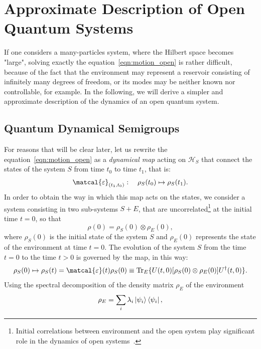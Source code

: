 \section{Approximate Description of Open Quantum Systems}
\label{appr_dynam_oqs}
If one considers a many-particles system, where the Hilbert space becomes "large", solving exactly the equation~\ref{eqn:motion_open} is rather difficult, because of the fact that the environment may represent a reservoir consisting of infinitely many degrees of freedom, or its modes may be neither known nor controllable, for example. In the following, we will derive a simpler and approximate description of the dynamics of an open quantum system. 

\subsection{Quantum Dynamical Semigroups}
For reasons that will be clear later, let us rewrite the equation~\ref{eqn:motion_open} as a \emph{dynamical map} acting on $\mathcal{H}_S$ that connect the states of the system $S$ from time $t_0$ to time $t_1$, that is:
\begin{equation}
    \matcal{\varepsilon}_{(t_1, t_0)}: \quad \rho_S(t_0) \mapsto \rho_S(t_1).
\end{equation}
In order to obtain the way in which this map acts on the states, we consider a system consisting in two sub-systems $S+E$, that are uncorrelated\footnote{Initial correlations between environment and the open system play significant role in the dynamics of open systems~\cite{PhysRevA.64.062106}.} at the initial time $t=0$, so that 
\begin{equation}
    \rho(0) = \rho_S(0) \otimes \rho_E(0),
\end{equation}
where $\rho_S(0)$ is the initial state of the system $S$ and $\rho_E(0)$ represents the state of the environment at time $t=0$. The evolution of the system $S$ from the time $t=0$ to the time $t>0$ is governed by the map, in this way:
\begin{equation}
\label{dynam_map}
    \rho_S(0) \mapsto \rho_S(t) = \matcal{\varepsilon}(t)\rho_S(0) \equiv \Tr_E \{U(t, 0)[\rho_S(0) \otimes \rho_E(0)] U^\dagger(t,0)\}.
\end{equation}
Using the spectral decomposition of the density matrix $\rho_E$ of the environment
\begin{equation*}
    \rho_E = \sum_i \lambda_i \ket{\psi_i}\bra{\psi_i},
\end{equation*}
